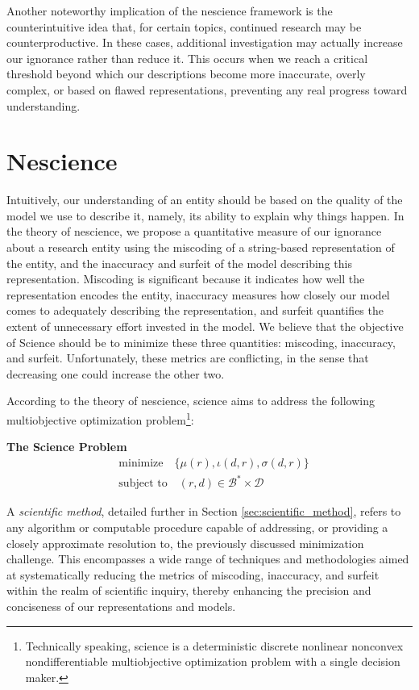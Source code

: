 Another noteworthy implication of the nescience framework is the counterintuitive idea that, for certain topics, continued research may be counterproductive. In these cases, additional investigation may actually increase our ignorance rather than reduce it. This occurs when we reach a critical threshold beyond which our descriptions become more inaccurate, overly complex, or based on flawed representations, preventing any real progress toward understanding. 

%
%

\section{Nescience}

Intuitively, our understanding of an entity should be based on the quality of the model we use to describe it, namely, its ability to explain why things happen. In the theory of nescience, we propose a quantitative measure of our ignorance about a research entity using the miscoding of a string-based representation of the entity, and the inaccuracy and surfeit of the model describing this representation. Miscoding is significant because it indicates how well the representation encodes the entity, inaccuracy measures how closely our model comes to adequately describing the representation, and surfeit quantifies the extent of unnecessary effort invested in the model. We believe that the objective of Science should be to minimize these three quantities: miscoding, inaccuracy, and surfeit. Unfortunately, these metrics are conflicting, in the sense that decreasing one could increase the other two.

According to the theory of nescience, science aims to address the following multiobjective optimization problem\footnote{Technically speaking, science is a deterministic discrete nonlinear nonconvex nondifferentiable multiobjective optimization problem with a single decision maker.}:

\begin{tBox}
\textbf{The Science Problem}
\begin{align*}
 & \text{minimize} \quad \{ \mu(r), \iota(d, r), \sigma(d, r)\} \\
 & \text{subject to} \quad (r, d) \in \mathcal{B}^\ast \times \mathcal{D}
\end{align*}
\end{tBox}

A \emph{scientific method}, detailed further in Section \ref{sec:scientific_method}, refers to any algorithm or computable procedure capable of addressing, or providing a closely approximate resolution to, the previously discussed minimization challenge. This encompasses a wide range of techniques and methodologies aimed at systematically reducing the metrics of miscoding, inaccuracy, and surfeit within the realm of scientific inquiry, thereby enhancing the precision and conciseness of our representations and models.

